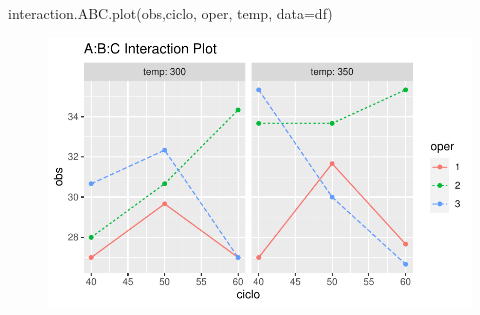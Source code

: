 \documentclass[
  letterpaper,
  DIV=11,
  numbers=noendperiod]{scrartcl}
\newenvironment{Shaded}{\begin{snugshade}}{\end{snugshade}}
\newcommand{\AttributeTok}[1]{\textcolor[rgb]{0.40,0.45,0.13}{#1}}
\newcommand{\FunctionTok}[1]{\textcolor[rgb]{0.28,0.35,0.67}{#1}}
\newcommand{\NormalTok}[1]{\textcolor[rgb]{0.00,0.23,0.31}{#1}}
\begin{document}
\begin{Shaded}
\begin{Highlighting}[]
\FunctionTok{interaction.ABC.plot}\NormalTok{(obs,ciclo, oper, temp, }\AttributeTok{data=}\NormalTok{df)}
\end{Highlighting}
\end{Shaded}

\begin{figure}[H]

{\centering \includegraphics{fatorial_multi_files/figure-pdf/unnamed-chunk-8-1.pdf}

}

\end{figure}
\end{document}
